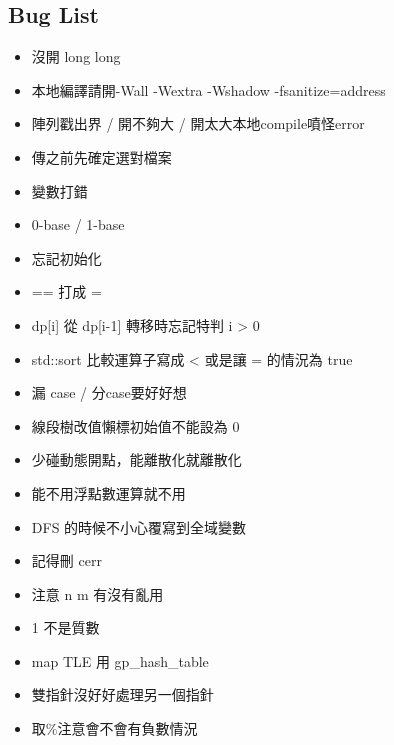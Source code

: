 \documentclass[a4paper,10pt,twocolumn,oneside,x11names]{article}
\begin{document}
\subsection{Bug List}
\begin{itemize}[nolistsep]
\item 沒開 long long
\item 本地編譯請開-Wall -Wextra -Wshadow -fsanitize=address
\item 陣列戳出界 / 開不夠大 / 開太大本地compile噴怪error
\item 傳之前先確定選對檔案
\item 變數打錯
\item 0-base / 1-base
\item 忘記初始化
\item == 打成 =
\item dp[i] 從 dp[i-1] 轉移時忘記特判 i > 0
\item std::sort 比較運算子寫成 < 或是讓 = 的情況為 true
\item 漏 case / 分case要好好想
\item 線段樹改值懶標初始值不能設為 0
\item 少碰動態開點，能離散化就離散化
\item 能不用浮點數運算就不用
\item DFS 的時候不小心覆寫到全域變數
\item 記得刪 cerr
\item 注意 n m 有沒有亂用
\item 1 不是質數
\item map TLE 用 gp\_hash\_table
\item 雙指針沒好好處理另一個指針
\item 取\%注意會不會有負數情況
\end{itemize}
\end{document}
